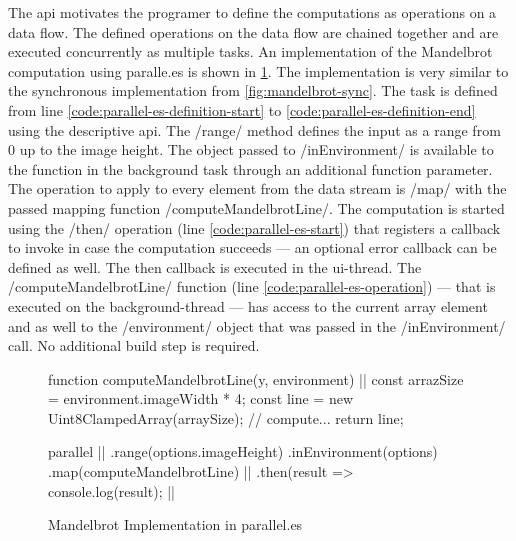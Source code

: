 The api motivates the programer to define the computations as operations on a data flow. The defined operations on the data flow are chained together and are executed concurrently as multiple tasks. An implementation of the Mandelbrot computation using paralle.es is shown in \cref{code:mandelbrot-parallel.es}. The implementation is very similar to the synchronous implementation from \cref{fig:mandelbrot-sync}. The task is defined from line \ref{code:parallel-es-definition-start} to \ref{code:parallel-es-definition-end} using the descriptive api. The \javascriptinline/range/ method defines the input as a range from 0 up to the image height. The object passed to \javascriptinline/inEnvironment/ is available to the function in the background task through an additional function parameter. The operation to apply to every element from the data stream is \javascriptinline/map/ with the passed mapping function \javascriptinline/computeMandelbrotLine/. The computation is started using the \javascriptinline/then/ operation (line \ref{code:parallel-es-start}) that registers a callback to invoke in case the computation succeeds --- an optional error callback can be defined as well. The then callback is executed in the ui-thread. The \javascriptinline/computeMandelbrotLine/ function (line \ref{code:parallel-es-operation}) --- that is executed on the background-thread --- has access to the current array element and as well to the \javascriptinline/environment/ object that was passed in the \javascriptinline/inEnvironment/ call. No additional build step is required.


\begin{figure}
	\begin{javascriptcode}
function computeMandelbrotLine(y, environment) { |$\label{code:parallel-es-operation}$|
	const arrazSize = environment.imageWidth * 4;
	const line = new Uint8ClampedArray(arraySize);
	// compute...
	return line;
}

parallel      |$\label{code:parallel-es-definition-start}$|
	.range(options.imageHeight)
	.inEnvironment(options)
	.map(computeMandelbrotLine) |$\label{code:parallel-es-definition-end}$|
	.then(result => console.log(result); |$\label{code:parallel-es-start}$|
	\end{javascriptcode}
	
	\caption{Mandelbrot Implementation in parallel.es}
	\label{code:mandelbrot-parallel.es}
\end{figure}

